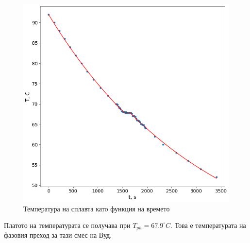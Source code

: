 \documentclass[aps, prb, twocolumn, a4paper, floatfix, reprint]{revtex4-2}
\begin{document}
\begin{figure}[H]
    \centering
    \caption{Температура на сплавта като функция на времето}
    \includegraphics[width=0.95\columnwidth, keepaspectratio=true]{cool3.png}
\end{figure}

Платото на температурата се получава при $T_{ph} = 67.9^{\circ}C$. Това е температурата на фазовия преход за тази смес на Вуд. 
\end{document}
